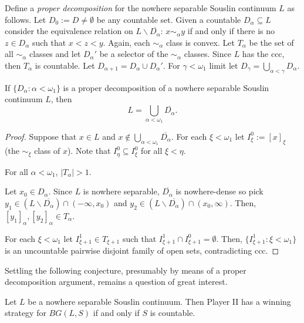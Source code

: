 Define a \emph{proper decomposition} for the nowhere separable Souslin continuum $L$ as follows.
Let $D_0:=D\neq\emptyset$ be any countable set.
Given a countable $D_\alpha\subseteq L$ consider the equivalence relation on $L\backslash\overline{D_\alpha}$:
$x\sim_\alpha y$ if and only if there is no $z\in D_\alpha$ such that $x<z<y$.
Again, each $\sim_\alpha$ class is convex.
Let $T_\alpha$ be the set of all $\sim_\alpha$ classes and let $D_\alpha'$ be a selector of the $\sim_\alpha$ classes.
Since $L$ has the ccc, then $T_\alpha$ is countable.
Let $D_{\alpha+1}=D_\alpha\cup D_\alpha'$.
For $\gamma<\omega_1$ limit let $D_\gamma=\bigcup_{\alpha<\gamma}D_\alpha$.

\begin{lemma}
    If $\{D_\alpha:\alpha<\omega_1\}$ is a proper decomposition of a nowhere separable Souslin continuum $L$, then $$L=\bigcup_{\alpha<\omega_1}\overline{D_\alpha}.$$
\end{lemma}

\begin{proof}
    Suppose that $x\in L$ and $x\notin \bigcup_{\alpha<\omega_1}\overline{D_\alpha}$.
    For each $\xi<\omega_1$ let $I_\xi^0:=[x]_\xi$ (the $\sim_\xi$ class of $x$).
    Note that $I_\eta^0\subseteq I_\xi^0$ for all $\xi<\eta$.
    \begin{claim}
        For all $\alpha<\omega_1$, $|T_\alpha|>1$.
    \end{claim}
    \begin{claimproof}
        Let $x_0\in D_\alpha$.
        Since $L$ is nowhere separable, $\overline{D_\alpha}$ is nowhere-dense so pick $y_1\in (L\backslash\overline{D_\alpha})\cap (-\infty, x_0)$ and $y_2\in (L\backslash\overline{D_\alpha})\cap (x_0,\infty)$.
        Then, $[y_1]_\alpha,[y_2]_\alpha\in T_\alpha$.
    \end{claimproof}
    For each $\xi<\omega_1$ let $I_{\xi+1}^1\in T_{\xi+1}$ such that $I_{\xi+1}^1\cap I_{\xi+1}^0=\emptyset$.
    Then, $\{I_{\xi+1}^1:\xi<\omega_1\}$ is an uncountable pairwise disjoint family of open sets, contradicting ccc.
\end{proof}

Settling the following conjecture, presumably by means of a proper decomposition argument, remains a question of great interest.

\begin{conjecture}
    Let $L$ be a nowhere separable Souslin continuum.
    Then Player II has a winning strategy for $BG(L,S)$ if and only if $S$ is countable.
\end{conjecture}

